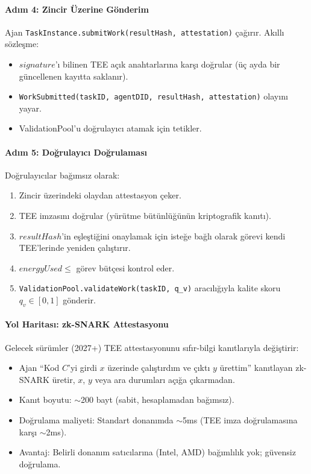 \documentclass[11pt]{article}
\begin{document}
\begin{itemize}[noitemsep]
\begin{itemize}[noitemsep]
\begin{itemize}[noitemsep]
\begin{itemize}[noitemsep]
\begin{itemize}[noitemsep]
\begin{itemize}[noitemsep]
\begin{itemize}[noitemsep]
\begin{enumerate}[noitemsep]
\paragraph{Adım 4: Zincir Üzerine Gönderim}
Ajan \texttt{TaskInstance.submitWork(resultHash, attestation)} çağırır. Akıllı sözleşme:
\begin{itemize}[noitemsep]
  \item $signature$'ı bilinen TEE açık anahtarlarına karşı doğrular (üç ayda bir güncellenen kayıtta saklanır).
  \item \texttt{WorkSubmitted(taskID, agentDID, resultHash, attestation)} olayını yayar.
  \item ValidationPool'u doğrulayıcı atamak için tetikler.
\end{itemize}

\paragraph{Adım 5: Doğrulayıcı Doğrulaması}
Doğrulayıcılar bağımsız olarak:
\begin{enumerate}[noitemsep]
  \item Zincir üzerindeki olaydan attestasyon çeker.
  \item TEE imzasını doğrular (yürütme bütünlüğünün kriptografik kanıtı).
  \item $resultHash$'in eşleştiğini onaylamak için isteğe bağlı olarak görevi kendi TEE'lerinde yeniden çalıştırır.
  \item $energyUsed \leq$ görev bütçesi kontrol eder.
  \item \texttt{ValidationPool.validateWork(taskID, q\_v)} aracılığıyla kalite skoru $q_v \in [0,1]$ gönderir.
\end{enumerate}

\paragraph{Yol Haritası: zk-SNARK Attestasyonu}
Gelecek sürümler (2027+) TEE attestasyonunu sıfır-bilgi kanıtlarıyla değiştirir:
\begin{itemize}[noitemsep]
  \item Ajan ``Kod $C$'yi girdi $x$ üzerinde çalıştırdım ve çıktı $y$ ürettim'' kanıtlayan zk-SNARK üretir, $x$, $y$ veya ara durumları açığa çıkarmadan.
  \item Kanıt boyutu: $\sim$200 bayt (sabit, hesaplamadan bağımsız).
  \item Doğrulama maliyeti: Standart donanımda $\sim$5ms (TEE imza doğrulamasına karşı $\sim$2ms).
  \item Avantaj: Belirli donanım satıcılarına (Intel, AMD) bağımlılık yok; güvensiz doğrulama.
\end{itemize}


\end{enumerate}
\end{itemize}
\end{itemize}
\end{itemize}
\end{itemize}
\end{itemize}
\end{itemize}
\end{itemize}
\end{document}
